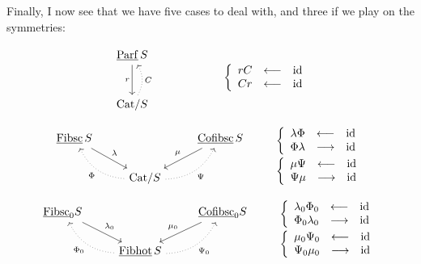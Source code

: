 \documentclass[11pt]{article}
\newcommand{\msp}[1]{\marginpar{\footnotesize [#1]}}
\newcommand{\ul}[1]{\underline{\mathrm{#1}}}
\begin{document}
Finally, I now see that we have five cases to deal with, and three if we play on the symmetries:

\msp{page 57}

\[
\begin{tikzcd}[row sep=large]
\ul{Parf}\,S \arrow[d, "r"'] \\
\mathrm{Cat}/S \arrow[u, dotted, bend right, "C"']
\end{tikzcd}
\qquad\qquad\qquad
\left\{\begin{array}{lcl}
rC & \longleftarrow & \mathrm{id} \\
Cr & \longleftarrow & \mathrm{id}
\end{array}\right.
\]

\[
\begin{tikzcd}
\ul{Fibsc}\,S \arrow[dr, "\lambda"] & & \ul{Cofibsc}\,S \arrow[dl, "\mu"'] \\
& \mathrm{Cat}/S \arrow[ul, dotted, bend left, "\Phi"] \arrow[ur, dotted, bend right, "\Psi"'] &
\end{tikzcd}
\qquad
\begin{array}{l}
\left\{\begin{array}{lcl}
\lambda\Phi & \longleftarrow & \mathrm{id} \\
\Phi\lambda & \longrightarrow & \mathrm{id}
\end{array}\right. \\[2ex]
\left\{\begin{array}{lcl}
\mu\Psi & \longleftarrow & \mathrm{id} \\
\Psi\mu & \longrightarrow & \mathrm{id}
\end{array}\right.
\end{array}
\]

\[
\begin{tikzcd}
\underline{\mathrm{Fibsc}}_0 S \arrow[dr, "\lambda_0"] & & \underline{\mathrm{Cofibsc}}_0 S \arrow[dl, "\mu_0"'] \\
& \ul{Fibhot}\,S \arrow[ul, dotted, bend left, "\Phi_0"] \arrow[ur, dotted, bend right, "\Psi_0"'] &
\end{tikzcd}
\qquad
\begin{array}{l}
\left\{\begin{array}{lcl}
\lambda_0\Phi_0 & \longleftarrow & \mathrm{id} \\
\Phi_0\lambda_0 & \longrightarrow & \mathrm{id}
\end{array}\right. \\[2ex]
\left\{\begin{array}{lcl}
\mu_0\Psi_0 & \longleftarrow & \mathrm{id} \\
\Psi_0\mu_0 & \longrightarrow & \mathrm{id}
\end{array}\right.
\end{array}
\]
\end{document}
